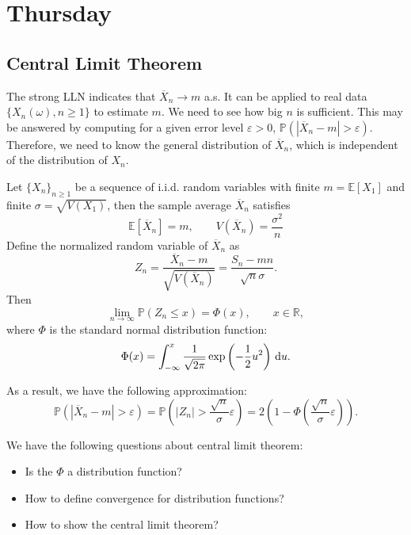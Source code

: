 
\section{Thursday}

\subsection{Central Limit Theorem}
The strong LLN indicates that $\overline{X}_n\to m$ a.s.
It can be applied to real data $\{X_n(\omega), n\ge1\}$ to estimate $m$.
We need to see how big $n$ is sufficient. 
This may be answered by computing for a given error level $\varepsilon>0$,
$\mathbb{P}(|\overline{X}_n- m|>\varepsilon)$.
Therefore, we need to know the general distribution of $\overline{X}_n$, which is independent of the distribution of $X_n$.

\begin{theorem}
Let $\{X_n\}_{n\ge1}$ be a sequence of i.i.d. random variables with finite $m=\mathbb{E}[X_1]$
and finite $\sigma = \sqrt{V(X_1)}$, then the sample average $\overline{X}_n$ satisfies
\[
\mathbb{E}[\overline{X}_n]=m,\qquad
V(\overline{X}_n) = \frac{\sigma^2}{n}
\]
Define the normalized random variable of $\overline{X}_n$ as
\[
Z_n = \frac{\overline{X}_n - m}{\sqrt{V(\overline{X}_n)}} = \frac{S_n - mn}{\sqrt{n}\sigma}.
\]
Then
\[
\lim_{n\to\infty}\mathbb{P}(Z_n\le x) = \Phi(x),\qquad x\in\mathbb{R},
\]
where $\Phi$ is the standard normal distribution function:
\[
 \Phi(x) = \int_{-\infty}^x\frac{1}{\sqrt{2\pi}}\exp\left(-\frac{1}{2}u^2\right)\,\mathrm{d} u.
\]
\end{theorem}
As a result, we have the following approximation:
\[
\mathbb{P}(|\overline{X}_n- m|>\varepsilon) 
=\mathbb{P}\left(
|Z_n|>\frac{\sqrt{n}}{\sigma}\varepsilon
\right) = 2\left(
1 - \Phi(\frac{\sqrt{n}}{\sigma}\varepsilon)
\right).
\]

We have the following questions about central limit theorem:
\begin{itemize}
\item
Is the $\Phi$ a distribution function?
\item
How to define convergence for distribution functions?
\item
How to show the central limit theorem?
\end{itemize}

